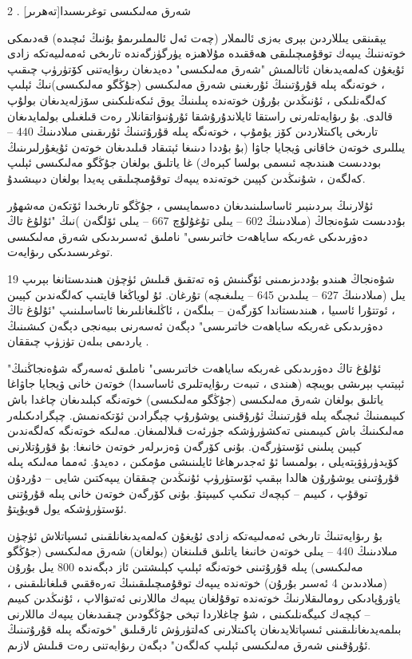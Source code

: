 \documentclass[a4paper]{article}
\begin{document}
\begin{flushright}
2 . شەرق مەلىكىسى توغرىسىدا[تەھرىر]

يېقىنقى يىللاردىن بېرى بەزى ئالىملار (چەت ئەل ئالىملىرىمۇ بۇنىڭ ئىچىدە) قەدىمكى خوتەننىڭ يىپەك توقۇمىچىلىقى ھەققىدە مۇلاھىزە يۈرگۈزگەندە تارىخى ئەمەلىيەتكە زادى ئۇيغۇن كەلمەيدىغان ئاتالمىش "شەرق مەلىكىسى" دەيدىغان رىۋايەتنى كۆتۈرۈپ چىقىپ ، خوتەنگە پىلە قۇرۇتىنىڭ ئۇرىغىنى شەرق مەلىكىسى (جۇڭگو مەلىكىسى)نىڭ ئېلىپ كەلگەنلىكى ، ئۇنىڭدىن بۇرۇن خوتەندە پىلىنىڭ يوق ئىكەنلىكىنى سۆزلەيدىغان بولۇپ قالدى. بۇ رىۋايەتلەرنى راستقا ئايلاندۇرۇشقا ئۇرۇنىۋاتقانلار رەت قىلغىلى بولمايدىغان تارىخى پاكىتلاردىن كۆز يۇمۇپ ، خوتەنگە پىلە قۇرۇتىنىڭ ئۇرىقىنى مىلادىنىڭ 440 – يىللىرى خوتەن خاقانى ۋيجايا جاۋا (بۇ بۇددا دىنىغا ئېتىقاد قىلىدىغان خوتەن ئۇيغۇرلىرىنىڭ بوددىست ھىندىچە ئىسمى بولسا كېرەك) غا ياتلىق بولغان جۇڭگو مەلىكىسى ئېلىپ كەلگەن ، شۇنىڭدىن كېيىن خوتەندە يىپەك توقۇمىچىلىقى پەيدا بولغان دىيىشىدۇ.



ئۇلارنىڭ بىردىنبىر ئاساسلىنىدىغان دەسمايىسى ، جۇڭگو تارىخىدا ئۆتكەن مەشھۇر بۇددىست شۇەنجاڭ (مىلادىنىڭ 602 – يىلى تۇغۇلۇچ 667 – يىلى ئۆلگەن )نىڭ "ئۇلۇغ تاڭ دەۋرىدىكى غەربكە ساياھەت خاتىرىسى" ناملىق ئەسىرىدىكى شەرق مەلىكىسى توغرىسىدىكى رىۋايەت.



شۇەنجاڭ ھىندو بۇددىزىمىنى ئۆگىنىش ۋە تەتقىق قىلىش ئۈچۈن ھىندىستانغا بېرىپ 19 يىل (مىلادىنىڭ 627 – يىلىدىن 645 – يىلىغىچە) تۇرغان. ئۇ لوياڭغا قايتىپ كەلگەندىن كېيىن ، ئوتتۇرا ئاسىيا ، ھىندىستاندا كۆرگەن – بىلگەن ، ئاڭلىغانلىرىغا ئاساسلىنىپ "ئۇلۇغ تاڭ دەۋرىدىكى غەربكە ساياھەت خاتىرىسى" دېگەن ئەسەرنى بىيەنجى دېگەن كىشىنىڭ ياردىمى بىلەن تۈزۈپ چىققان .



"ئۇلۇغ تاڭ دەۋرىدىكى غەربكە ساياھەت خاتىرىسى" ناملىق ئەسەرگە شۇەنجاڭنىڭ ئېيتىپ بېرىشى بويىچە (ھىندى ، تىبەت رىۋايەتلىرى ئاساسىدا) خوتەن خانى ۋيجايا جاۋاغا ياتلىق بولغان شەرق مەلىكىسى (جۇڭگو مەلىكىسى) خوتەنگە كېلىدىغان چاغدا باش كىيىمىنىڭ ئىچىگە پىلە قۇرتىنىڭ ئۇرۇقىنى يوشۇرۇپ چېگرادىن ئۆتكەنمىش. چېگرادىكىلەر مەلىكىنىڭ باش كىيىمىنى تەكشۈرۈشكە جۈرئەت قىلالمىغان. مەلىكە خوتەنگە كەلگەندىن كېيىن پىلىنى ئۆستۈرگەن. بۇنى كۆرگەن ۋەزىرلەر خوتەن خانىغا: بۇ قۇرۇتلارنى كۆيدۈرۈۋېتەيلى ، بولمىسا ئۇ ئەجدىرھاغا ئايلىنىشى مۇمكىن ، دەيدۇ. ئەمما مەلىكە پىلە قۇرۇتىنى يوشۇرۇن ھالدا بېقىپ ئۆستۈرۈپ ئۇنىڭدىن چىققان يىپەكتىن شايى – دۇردۇن توقۇپ ، كىيىم – كېچەك تىكىپ كىيىپتۇ. بۇنى كۆرگەن خوتەن خانى پىلە قۇرۇتنى ئۆستۈرۈشكە يول قويۇپتۇ.



بۇ رىۋايەتنىڭ تارىخى ئەمەلىيەتكە زادى ئۇيغۇن كەلمەيدىغانلقىنى ئىسپاتلاش ئۈچۈن مىلادىنىڭ 440 – يىلى خوتەن خانىغا ياتلىق قىلىنغان (بولغان) شەرق مەلىكىسى (جۇڭگو مەلىكىسى) پىلە قۇرۇتىنى خوتەنگە ئېلىپ كېلىشتىن ئاز دېگەندە 800 يىل بۇرۇن (مىلادىدىن 4 ئەسىر بۇرۇن) خوتەندە يىپەك توقۇمىچىلىقىنىڭ تەرەققىي قىلغانلىقىنى ، ياۋرۇپادىكى رومالىقلارنىڭ خوتەندە توقۇلغان يىپەك ماللارنى ئەتىۋالاپ ، ئۇنىڭدىن كىيىم – كېچەك كىيگەنلىكىنى ، شۇ چاغلاردا تېخى جۇڭگودىن چىقىدىغان يىپەك ماللارنى بىلمەيدىغانلىقىنى ئىسپاتلايدىغان پاكىتلارنى كەلتۈرۈش ئارقىلىق "خوتەنگە پىلە قۇرۇتىنىڭ ئۇرۇقىنى شەرق مەلىكىسى ئېلىپ كەلگەن" دېگەن رىۋايەتنى رەت قىلىش لازىم.




\end{flushright}
\end{document}
